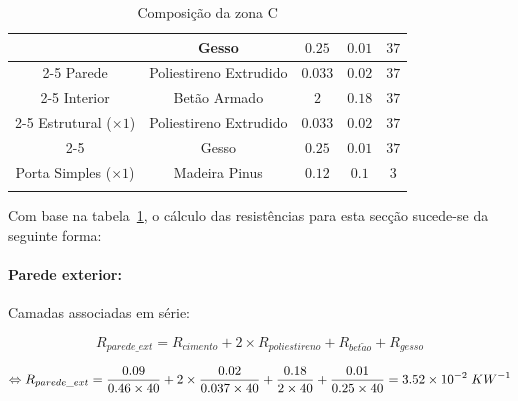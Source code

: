 \documentclass[12pt, a4paper]{article}
\begin{document}
\begin{table}[htpb]
\begin{center}
\begin{tabular}{c c c c c}
			\multirow{5}{*}{}          & Gesso                  & $0.25$                            & $0.01$                       & $37$          \\
				\cline{2-5}
			Parede                     & Poliestireno Extrudido & $0.033$                           & $0.02$                       & $37$          \\
				\cline{2-5}
			Interior                   & Betão Armado           & $2$                               & $0.18$                       & $37$          \\
				\cline{2-5}
			Estrutural ($\times 1$)    & Poliestireno Extrudido & $0.033$                           & $0.02$                       & $37$          \\
				\cline{2-5}
			                           & Gesso                  & $0.25$                            & $0.01$                       & $37$          \\
				\midrule{}

			Porta Simples ($\times 1$) & Madeira Pinus          & $0.12$                            & $0.1$                        & $3$           \\
			\bottomrule{}
		\end{tabular}
	\end{center}
	\caption{Composição da zona C}\label{tab:zona_c}
\end{table}


Com base na tabela~\ref{tab:zona_c}, o cálculo das resistências para esta secção sucede-se da seguinte forma:

\paragraph{Parede exterior:}\label{par:zona_c_ext}Camadas associadas em série:

\begin{equation}
	R_{parede\_ext} = R_{cimento} + 2 \times R_{poliestireno} + R_{bet\tilde{a}o} + R_{gesso}
	\label{eq:zona_c_ext_1}
\end{equation}

\begin{equation}
	\Leftrightarrow R_{parede\_ext} =
	\dfrac{0.09}{0.46 \times 40} +
	2 \times \dfrac{0.02}{0.037 \times 40} +
	\dfrac{0.18}{2 \times 40} +
	\dfrac{0.01}{0.25 \times 40} = 3.52 \times 10^{-2} \hspace{1mm} KW^{-1}
	\label{eq:zona_c_ext_2}
\end{equation}
\end{document}

